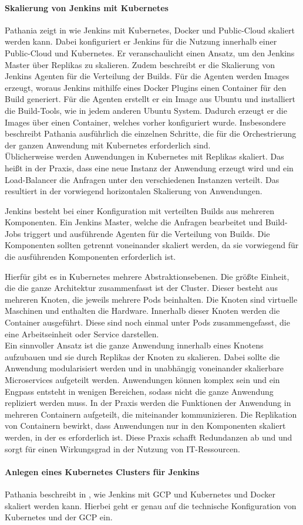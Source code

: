 \paragraph{Skalierung von Jenkins mit Kubernetes}
\label{jenkins:skalierung}
Pathania zeigt in \cite{Pathania2017} wie Jenkins mit Kubernetes, Docker und Public-Cloud skaliert werden kann. Dabei konfiguriert er Jenkins für die Nutzung innerhalb einer Public-Cloud und Kubernetes. Er veranschaulicht einen Ansatz, um den Jenkins Master über Replikas zu skalieren. Zudem beschreibt er die Skalierung von Jenkins Agenten für die Verteilung der Builds. Für die Agenten werden Images erzeugt, woraus Jenkins mithilfe eines Docker Plugins einen Container für den Build generiert. Für die Agenten erstellt er ein Image aus Ubuntu und installiert die Build-Tools, wie in jedem anderen Ubuntu System.
Dadurch erzeugt er die Images über einen Container, welches vorher konfiguriert wurde. Insbesondere beschreibt Pathania ausführlich die einzelnen Schritte, die für die Orchestrierung der ganzen Anwendung mit Kubernetes erforderlich sind.
\medskip
\\
Üblicherweise werden Anwendungen in Kubernetes mit Replikas skaliert. Das heißt in der Praxis, dass eine neue Instanz der Anwendung erzeugt wird und ein Load-Balancer die Anfragen unter den verschiedenen Instanzen verteilt. Das resultiert in der vorwiegend horizontalen Skalierung von Anwendungen. 

Jenkins besteht bei einer Konfiguration mit verteilten Builds aus mehreren Komponenten. Ein Jenkins Master, welche die Anfragen bearbeitet und Build-Jobs triggert und ausführende Agenten für die Verteilung von Builds. Die Komponenten sollten getrennt voneinander skaliert werden, da sie vorwiegend für die ausführenden Komponenten erforderlich ist. 

Hierfür gibt es in Kubernetes mehrere Abstraktionsebenen. Die größte Einheit, die die ganze Architektur zusammenfasst ist der Cluster. Dieser besteht aus mehreren Knoten, die jeweils mehrere Pods beinhalten. Die Knoten sind virtuelle Maschinen und enthalten die Hardware. Innerhalb dieser Knoten werden die Container ausgeführt. Diese sind noch einmal unter Pods zusammengefasst, die eine Arbeitseinheit oder Service darstellen. 
\medskip
\\
Ein sinnvoller Ansatz ist die ganze Anwendung innerhalb eines Knotens aufzubauen und sie durch Replikas der Knoten zu skalieren. Dabei sollte die Anwendung modularisiert werden und in unabhängig voneinander skalierbare Microservices aufgeteilt werden. Anwendungen können komplex sein und ein Engpass entsteht in wenigen Bereichen, sodass nicht die ganze Anwendung repliziert werden muss. In der Praxis werden die Funktionen der Anwendung in mehreren Containern aufgeteilt, die miteinander kommunizieren. Die Replikation von Containern bewirkt, dass Anwendungen nur in den Komponenten skaliert werden, in der es erforderlich ist. Diese Praxis schafft Redundanzen ab und und sorgt für einen Wirkungsgrad in der Nutzung von IT-Ressourcen.

\paragraph{Anlegen eines Kubernetes Clusters für Jenkins}
Pathania beschreibt in \cite{Pathania2017}, wie Jenkins mit \ac{GCP} und Kubernetes und Docker skaliert werden kann. Hierbei geht er genau auf die technische Konfiguration von Kubernetes und der \ac{GCP} ein.